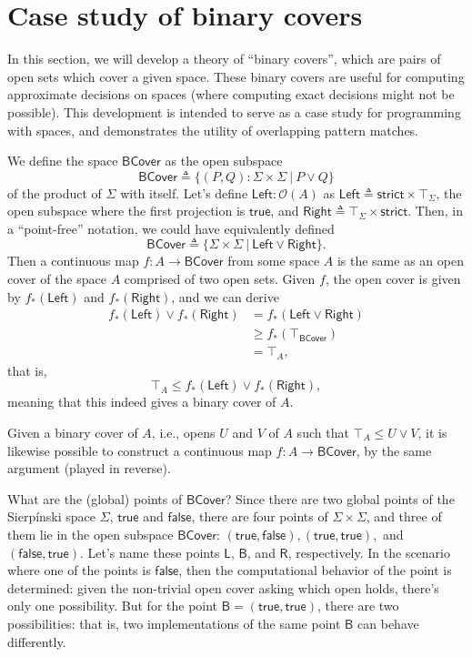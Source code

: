 \documentclass[conference]{IEEEtran}
\newcommand{\suchthat}{\ |\ }
\newcommand{\Open}[1]{\mathcal{O}({#1})}
\begin{document}
\section{Case study of binary covers}

In this section, we will develop a theory of ``binary covers'', which are pairs of open sets which cover a given space. These binary covers are useful for computing approximate decisions on spaces (where computing exact decisions might not be possible). This development is intended to serve as a case study for programming with spaces, and demonstrates the utility of overlapping pattern matches.

We define the space $\mathsf{BCover}$ as the open subspace
\[
\mathsf{BCover} \triangleq \{ (P, Q) : \Sigma \times \Sigma \suchthat P \vee Q \}
\]
of the product of $\Sigma$ with itself. Let's define $\mathsf{Left} : \Open{A}$ as $\mathsf{Left} \triangleq \mathsf{strict} \times \top_\Sigma$, the open subspace where the first projection is $\mathsf{true}$, and $\mathsf{Right} \triangleq \top_\Sigma \times \mathsf{strict}$. Then, in a ``point-free'' notation, we could have equivalently defined
\[
\mathsf{BCover} \triangleq \{ \Sigma \times \Sigma \suchthat \mathsf{Left} \vee \mathsf{Right} \}.
\]
Then a continuous map $f : A \to \mathsf{BCover}$ from some space $A$ is the same as an open cover of the space $A$ comprised of two open sets.  Given $f$, the open cover is given by $f_*(\mathsf{Left})$ and $f_*(\mathsf{Right})$, and we can derive
\begin{align*}
f_*(\mathsf{Left}) \vee f_*(\mathsf{Right})
&= f_*(\mathsf{Left} \vee \mathsf{Right})
\\ &\ge f_*\left (\top_\mathsf{BCover} \right)
\\ &= \top_A, %
\end{align*}
that is,
\[
\top_A \le f_*(\mathsf{Left}) \vee f_*(\mathsf{Right}),
\]
meaning that this indeed gives a binary cover of $A$.

Given a binary cover of $A$, i.e., opens $U$ and $V$ of $A$ such that $\top_A \le U \vee V$, it is likewise possible to construct a continuous map $f: A \to \mathsf{BCover}$, by the same argument (played in reverse).

What are the (global) points of $\mathsf{BCover}$? Since there are two global points of the Sierp\'inski space $\Sigma$, $\mathsf{true}$ and $\mathsf{false}$, there are four points of $\Sigma \times \Sigma$, and three of them lie in the open subspace $\mathsf{BCover}$: $(\mathsf{true}, \mathsf{false}), (\mathsf{true}, \mathsf{true}),$ and $(\mathsf{false}, \mathsf{true})$. Let's name these points $\mathsf{L}$, $\mathsf{B}$, and $\mathsf{R}$, respectively. In the scenario where one of the points is $\mathsf{false}$, then the computational behavior of the point is determined: given the non-trivial open cover asking which open holds, there's only one possibility. But for the point $\mathsf{B} = (\mathsf{true}, \mathsf{true})$, there are two possibilities: that is, two implementations of the same point $\mathsf{B}$ can behave differently.
\end{document}
